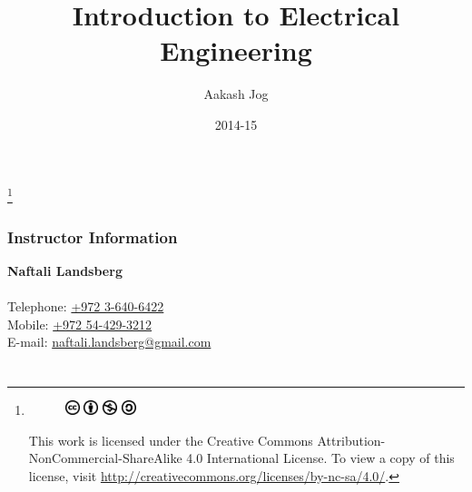 \documentclass[fleqn, a4paper, 12pt, twoside]{article}
\title{Introduction to Electrical Engineering}
\author{Aakash Jog}
\date{2014-15}
\theoremstyle{definition}
\theoremstyle{theorem}
\newcommand\blfootnote[1]{%
	\begingroup
	\renewcommand\thefootnote{}\footnote{#1}%
	\addtocounter{footnote}{-1}%
	\endgroup
}
\begin{document}
\maketitle

\blfootnote
{	
	\begin{figure}[H]
		\includegraphics[height = 12pt]{cc.eps}
		\includegraphics[height = 12pt]{by.eps}
		\includegraphics[height = 12pt]{nc.eps}
		\includegraphics[height = 12pt]{sa.eps}
	\end{figure}
	This work is licensed under the Creative Commons Attribution-NonCommercial-ShareAlike 4.0 International License. To view a copy of this license, visit \url{http://creativecommons.org/licenses/by-nc-sa/4.0/}.
} %

\tableofcontents

 \newpage

\section{Instructor Information}

\textbf{Naftali Landsberg}\\
~\\
Telephone: \href{tel:+97236406422}{+972 3-640-6422}\\
Mobile: \href{tel:+972544293212}{+972 54-429-3212}\\
E-mail: \href{mailto:naftali.landsberg@gmail.com}{naftali.landsberg@gmail.com}\\

\newpage
\part{}

\section{}
\end{document}
